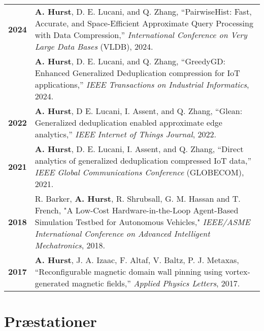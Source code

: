 \documentclass[a4paper,11pt]{article}
\begin{document}
\noindent
\begin{tabular}{p{}p{}}
    \textbf{2024} & \textbf{A. Hurst}, D. E. Lucani, and Q. Zhang, “PairwiseHist: Fast, Accurate, and Space-Efficient Approximate Query Processing with Data Compression,” \textit{International Conference on Very Large Data Bases} (VLDB), 2024. \\

     & \textbf{A. Hurst}, D. E. Lucani, and Q. Zhang, “GreedyGD: Enhanced Generalized Deduplication compression for IoT applications,” \textit{IEEE Transactions on Industrial Informatics}, 2024. \\

    \textbf{2022} & \textbf{A. Hurst}, D E. Lucani, I. Assent, and Q. Zhang, “Glean: Generalized deduplication enabled approximate edge analytics,” \textit{IEEE Internet of Things Journal}, 2022. \\

    \textbf{2021} & \textbf{A. Hurst}, D. E. Lucani, I. Assent, and Q. Zhang, ``Direct analytics of generalized deduplication compressed IoT data,'' \textit{IEEE Global Communications Conference} (GLOBECOM), 2021. \\

    \textbf{2018} & R. Barker, \textbf{A. Hurst}, R. Shrubsall, G. M. Hassan and T. French, "A Low-Cost Hardware-in-the-Loop Agent-Based Simulation Testbed for Autonomous Vehicles," \textit{IEEE/ASME International Conference on Advanced Intelligent Mechatronics}, 2018. \\

    \textbf{2017} & \textbf{A. Hurst}, J. A. Izaac, F. Altaf, V. Baltz, P. J. Metaxas, “Reconfigurable magnetic domain wall pinning using vortex-generated magnetic fields,” \textit{Applied Physics Letters}, 2017. \\
\end{tabular}





\section{Præstationer}
\end{document}
